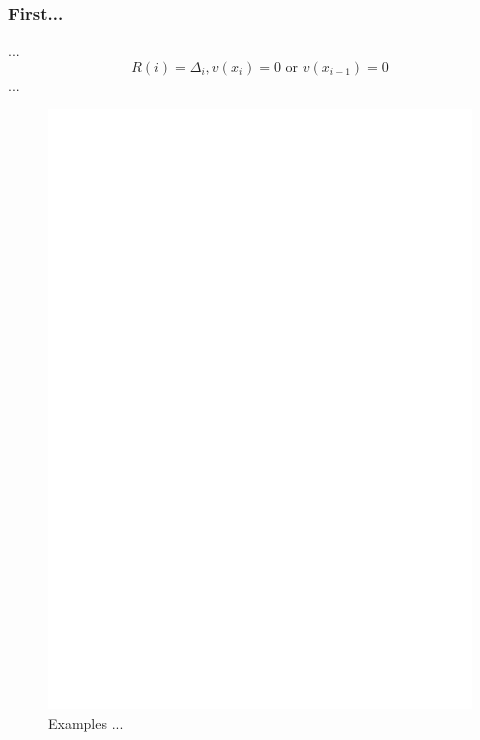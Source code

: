 \documentclass[runningheads]{llncs}
\begin{document}
\subsubsection{First...} ...
\begin{equation}
R(i)=\Delta _i,v(x_i)=0 \text{ or } v(x_{i-1})=0
\end{equation}
... 
\begin{figure}
\includegraphics[width=\textwidth]{fig1.pdf}
\caption{Examples ... } \label{fig1}
\end{figure}
\end{document}
